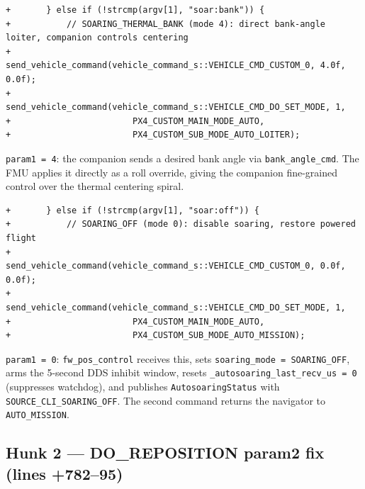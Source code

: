 \documentclass[12pt,a4paper]{article}
\begin{document}
\begin{lstlisting}[style=diff]
+		} else if (!strcmp(argv[1], "soar:bank")) {
+			// SOARING_THERMAL_BANK (mode 4): direct bank-angle loiter, companion controls centering
+			send_vehicle_command(vehicle_command_s::VEHICLE_CMD_CUSTOM_0, 4.0f, 0.0f);
+			send_vehicle_command(vehicle_command_s::VEHICLE_CMD_DO_SET_MODE, 1,
+					     PX4_CUSTOM_MAIN_MODE_AUTO,
+					     PX4_CUSTOM_SUB_MODE_AUTO_LOITER);
\end{lstlisting}
\begin{annotation}\texttt{param1 = 4}: the companion sends a desired bank angle via \texttt{bank\_angle\_cmd}. The FMU applies it directly as a roll override, giving the companion fine-grained control over the thermal centering spiral.\end{annotation}

\begin{lstlisting}[style=diff]
+		} else if (!strcmp(argv[1], "soar:off")) {
+			// SOARING_OFF (mode 0): disable soaring, restore powered flight
+			send_vehicle_command(vehicle_command_s::VEHICLE_CMD_CUSTOM_0, 0.0f, 0.0f);
+			send_vehicle_command(vehicle_command_s::VEHICLE_CMD_DO_SET_MODE, 1,
+					     PX4_CUSTOM_MAIN_MODE_AUTO,
+					     PX4_CUSTOM_SUB_MODE_AUTO_MISSION);
\end{lstlisting}
\begin{annotation}\texttt{param1 = 0}: \texttt{fw\_pos\_control} receives this, sets \texttt{soaring\_mode = SOARING\_OFF}, arms the 5-second DDS inhibit window, resets \texttt{\_autosoaring\_last\_recv\_us = 0} (suppresses watchdog), and publishes \texttt{AutosoaringStatus} with \texttt{SOURCE\_CLI\_SOARING\_OFF}. The second command returns the navigator to \texttt{AUTO\_MISSION}.\end{annotation}

\subsection{Hunk 2 --- DO\_REPOSITION param2 fix (lines +782--95)}
\end{document}
